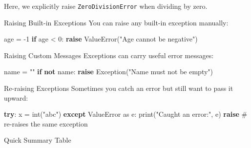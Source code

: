 \documentclass[
  letterpaper,
  DIV=11,
  numbers=noendperiod]{scrreprt}
\newenvironment{Shaded}{\begin{snugshade}}{\end{snugshade}}
\newcommand{\BuiltInTok}[1]{\textcolor[rgb]{0.00,0.23,0.31}{#1}}
\newcommand{\CommentTok}[1]{\textcolor[rgb]{0.37,0.37,0.37}{#1}}
\newcommand{\ControlFlowTok}[1]{\textcolor[rgb]{0.00,0.23,0.31}{\textbf{#1}}}
\newcommand{\DecValTok}[1]{\textcolor[rgb]{0.68,0.00,0.00}{#1}}
\newcommand{\ImportTok}[1]{\textcolor[rgb]{0.00,0.46,0.62}{#1}}
\newcommand{\KeywordTok}[1]{\textcolor[rgb]{0.00,0.23,0.31}{\textbf{#1}}}
\newcommand{\NormalTok}[1]{\textcolor[rgb]{0.00,0.23,0.31}{#1}}
\newcommand{\OperatorTok}[1]{\textcolor[rgb]{0.37,0.37,0.37}{#1}}
\newcommand{\PreprocessorTok}[1]{\textcolor[rgb]{0.68,0.00,0.00}{#1}}
\newcommand{\StringTok}[1]{\textcolor[rgb]{0.13,0.47,0.30}{#1}}
\begin{document}
Here, we explicitly raise \texttt{ZeroDivisionError} when dividing by
zero.

Raising Built-in Exceptions You can raise any built-in exception
manually:

\begin{Shaded}
\begin{Highlighting}[]
\NormalTok{age }\OperatorTok{=} \OperatorTok{{-}}\DecValTok{1}
\ControlFlowTok{if}\NormalTok{ age }\OperatorTok{\textless{}} \DecValTok{0}\NormalTok{:}
    \ControlFlowTok{raise} \PreprocessorTok{ValueError}\NormalTok{(}\StringTok{"Age cannot be negative"}\NormalTok{)}
\end{Highlighting}
\end{Shaded}

Raising Custom Messages Exceptions can carry useful error messages:

\begin{Shaded}
\begin{Highlighting}[]
\NormalTok{name }\OperatorTok{=} \StringTok{""}
\ControlFlowTok{if} \KeywordTok{not}\NormalTok{ name:}
    \ControlFlowTok{raise} \PreprocessorTok{Exception}\NormalTok{(}\StringTok{"Name must not be empty"}\NormalTok{)}
\end{Highlighting}
\end{Shaded}

Re-raising Exceptions Sometimes you catch an error but still want to
pass it upward:

\begin{Shaded}
\begin{Highlighting}[]
\ControlFlowTok{try}\NormalTok{:}
\NormalTok{    x }\OperatorTok{=} \BuiltInTok{int}\NormalTok{(}\StringTok{"abc"}\NormalTok{)}
\ControlFlowTok{except} \PreprocessorTok{ValueError} \ImportTok{as}\NormalTok{ e:}
    \BuiltInTok{print}\NormalTok{(}\StringTok{"Caught an error:"}\NormalTok{, e)}
    \ControlFlowTok{raise}   \CommentTok{\# re{-}raises the same exception}
\end{Highlighting}
\end{Shaded}

Quick Summary Table
\end{document}
